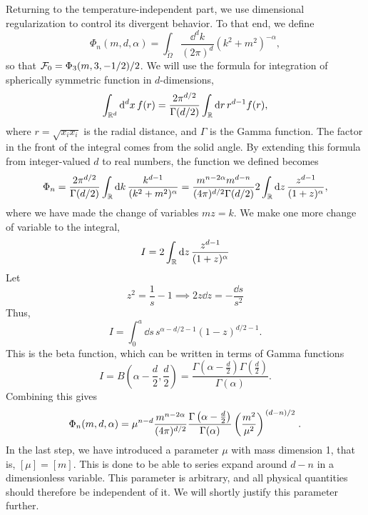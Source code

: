 Returning to the temperature-independent part, we use dimensional regularization to control its divergent behavior.
To that end, we define
\begin{equation}
    \label{def dimreg integral}
    \Phi_n(m, d, \alpha) 
    = \int_{\tilde \Omega} \frac{\dd^d k}{(2 \pi)^d} (k^2 + m^2)^{-\alpha},
\end{equation}
so that $\mathcal{F}_0 = \Phi_3(m, 3, -1/2) / 2$.
We will use the formula for integration of spherically symmetric function in $d$-dimensions,
\begin{equation}
    \int_{\mathbb{R}^d} \dd^d x \, f(r) 
    = \frac{2 \pi^{d/2}}{\Gamma(d/2)} \int_{\mathbb{R}} \dd r \, r^{d-1}f(r),
\end{equation}
where $r = \sqrt{x_i x_i}$ is the radial distance, and $\Gamma$ is the Gamma function.
The factor in the front of the integral comes from the solid angle.
By extending this formula from integer-valued $d$ to real numbers, the function we defined becomes
\begin{equation}
    \Phi_n
    = \frac{2 \pi^{d/2} }{\Gamma(d/2)} \int_{\mathbb{R}} \dd k \, 
    \frac{k^{d-1}}{(k^2 + m^2)^\alpha}
    = \frac{m^{n-2\alpha}m^{d-n} }{(4 \pi)^{d / 2}\Gamma(d/2)} 
    2 \int_{\mathbb{R}} \dd z \, \frac{z^{d - 1}}{(1 + z)^\alpha}, 
\end{equation}
where we have made the change of variables $m z = k$.
We make one more change of variable to the integral,
\begin{equation}
    I = 2 \int_{\mathbb{R}} \dd z \, \frac{z^{d - 1}}{(1 + z)^\alpha}
\end{equation}
Let
\begin{equation}
    z^2 = \frac{1}{s} - 1 \implies 2 z \dd z = - \frac{\dd s}{s^2}
\end{equation}
Thus,
\begin{equation}
    I = \int_0^a \dd s \, s^{\alpha - d/2 - 1} (1 - z)^{d/2 - 1}.
\end{equation}
This is the beta function, which can be written in terms of Gamma functions~\cite{Peskin:IntroQFT}
\begin{equation}
    I = B\left(\alpha - \frac{d}{2}, \frac{d}{2}\right) 
    = \frac{\Gamma\left(\alpha - \frac{d}{2}\right) \Gamma\left(\frac{d}{2}\right)}{\Gamma(\alpha)}.
\end{equation}
Combining this gives
\begin{equation}
    \label{result dimreg}
    \Phi_n(m, d, \alpha) 
    = \mu^{n-d} \frac{m^{n - 2\alpha}}{(4 \pi)^{d / 2}}
    \frac{
        \Gamma \left(\alpha - \frac{d}{2} \right) 
    }
    {\Gamma(\alpha)}
    \left(\frac{m^2}{\mu^2}\right)^{\flatfrac{(d-n)}{2}} 
    .
\end{equation}
In the last step, we have introduced a parameter $\mu$ with mass dimension 1, that is, $[\mu] = [m]$.
This is done to be able to series expand around $d - n$ in a dimensionless variable. 
This parameter is arbitrary, and all physical quantities should therefore be independent of it.
We will shortly justify this parameter further.


